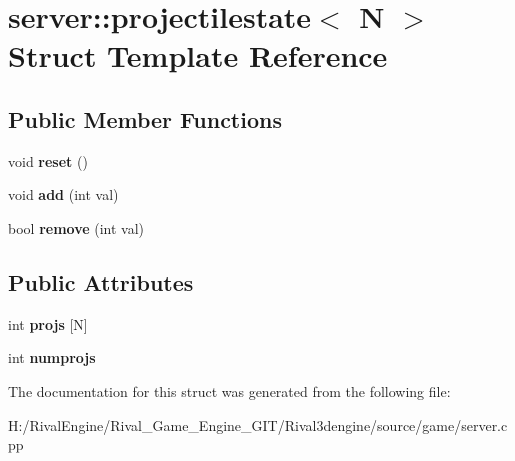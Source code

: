 \hypertarget{structserver_1_1projectilestate}{}\section{server\+:\+:projectilestate$<$ N $>$ Struct Template Reference}
\label{structserver_1_1projectilestate}
\subsection*{Public Member Functions}
\begin{DoxyCompactItemize}
\item 
\mbox{\label{structserver_1_1projectilestate_a7bde184b2e92aa27fedf06a0610df72b}} 
void {\bfseries reset} ()
\item 
\mbox{\label{structserver_1_1projectilestate_a3fa4adb3fca7323b50ad5be14635d9a8}} 
void {\bfseries add} (int val)
\item 
\mbox{\label{structserver_1_1projectilestate_a622a9b3c9bb0558893a5fc149d4312c7}} 
bool {\bfseries remove} (int val)
\end{DoxyCompactItemize}
\subsection*{Public Attributes}
\begin{DoxyCompactItemize}
\item 
\mbox{\label{structserver_1_1projectilestate_a8970cf1bda20fceb52b70e9d1d5f2b6e}} 
int {\bfseries projs} \mbox{[}N\mbox{]}
\item 
\mbox{\label{structserver_1_1projectilestate_a7338288da8beb21e615d84aea15d261f}} 
int {\bfseries numprojs}
\end{DoxyCompactItemize}


The documentation for this struct was generated from the following file\+:\begin{DoxyCompactItemize}
\item 
H\+:/\+Rival\+Engine/\+Rival\+\_\+\+Game\+\_\+\+Engine\+\_\+\+G\+I\+T/\+Rival3dengine/source/game/server.\+cpp\end{DoxyCompactItemize}
